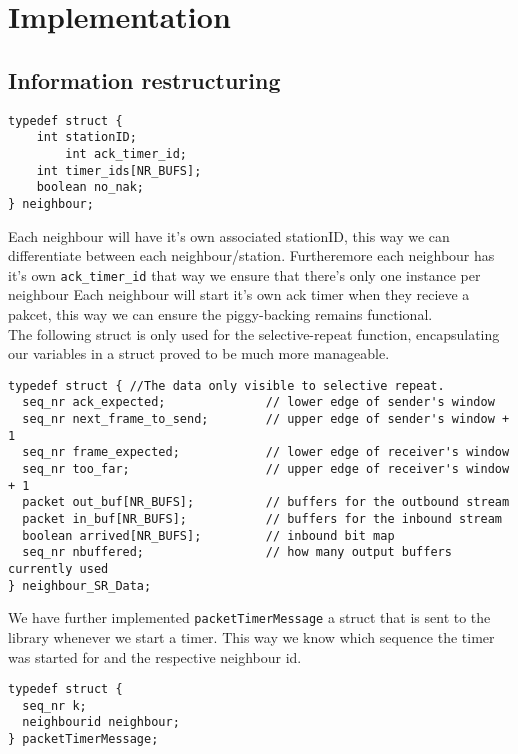 \section{Implementation}
\subsection{Information restructuring}

\begin{lstlisting}
typedef struct {
    int stationID;
		int ack_timer_id;
    int timer_ids[NR_BUFS];
    boolean no_nak;
} neighbour;
\end{lstlisting}

Each neighbour will have it's own associated stationID,
this way we can differentiate between each neighbour/station.
Furtheremore each neighbour has it's own \texttt{ack\_timer\_id} that way we ensure that there's only one instance per neighbour
Each neighbour will start it's own ack timer when they recieve a pakcet,
this way we can ensure the piggy-backing remains functional.
\\

The following struct is only used for the selective-repeat function,
encapsulating our variables in a struct proved to be much more manageable.

\begin{lstlisting}
typedef struct { //The data only visible to selective repeat.
  seq_nr ack_expected;              // lower edge of sender's window
  seq_nr next_frame_to_send;        // upper edge of sender's window + 1
  seq_nr frame_expected;            // lower edge of receiver's window
  seq_nr too_far;                   // upper edge of receiver's window + 1
  packet out_buf[NR_BUFS];          // buffers for the outbound stream
  packet in_buf[NR_BUFS];           // buffers for the inbound stream
  boolean arrived[NR_BUFS];         // inbound bit map
  seq_nr nbuffered;                 // how many output buffers currently used
} neighbour_SR_Data;
\end{lstlisting}


We have further implemented \texttt{packetTimerMessage} a struct that is sent to the library whenever we start a timer.
This way we know which sequence the timer was started for and the respective neighbour id.
\begin{lstlisting}
typedef struct {
  seq_nr k;
  neighbourid neighbour;
} packetTimerMessage;
\end{lstlisting}

\hfill \break
